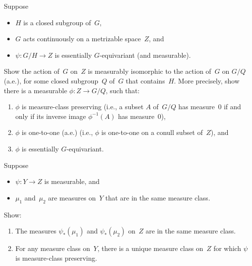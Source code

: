 \begin{exercises}
\item \label{GQuot(G/H)}
Suppose 
\noprelistbreak
	\begin{itemize}
	\item $H$ is a closed subgroup of~$G$, 
	\item $G$ acts continuously on a metrizable space~$Z$,
	and
	\item $\psi \colon G/H \to Z$ is essentially $G$-equivariant (and measurable).
	\end{itemize}
Show the action of~$G$ on~$Z$ is measurably isomorphic to the action of~$G$ on $G/Q$ (a.e.), for some closed subgroup~$Q$ of~$G$ that contains~$H$. More precisely, show there is a measurable $\phi \colon Z \to G/Q$, such that:%
\noprelistbreak
	\begin{enumerate}
	\item $\phi$ is measure-class preserving (i.e., a subset $A$ of~$G/Q$ has measure~$0$ if and only if its inverse image $\phi^{-1}(A)$ has measure~$0$),
	\item $\phi$ is one-to-one (a.e.) (i.e., $\phi$ is one-to-one on a conull subset of~$Z$),
	and
	\item $\phi$ is essentially $G$-equivariant.
	\end{enumerate}

\item \label{UniqMeasClassPresEx}
Suppose 
\noprelistbreak
	\begin{itemize}
	\item $\psi \colon Y \to Z$ is measurable,
	and
	\item $\mu_1$ and~$\mu_2$ are measures on~$Y$ that are in the same measure class.
	\end{itemize}
Show:
\noprelistbreak
	\begin{enumerate}
	\item The measures $\psi_*(\mu_1)$ and $\psi_*(\mu_2)$ on~$Z$ are in the same measure class.
	\item For any measure class on~$Y$, there is a unique measure class on~$Z$ for which $\psi$ is measure-class preserving.
	\end{enumerate}


\end{exercises}
